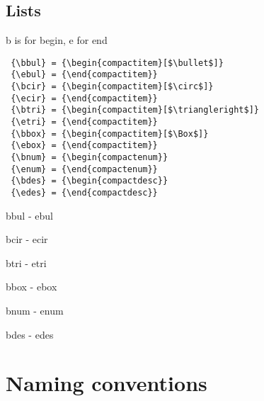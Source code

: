 \subsection{Lists}
b is for begin, e for end
\begin{verbatim}
 {\bbul} = {\begin{compactitem}[$\bullet$]}
 {\ebul} = {\end{compactitem}}
 {\bcir} = {\begin{compactitem}[$\circ$]}
 {\ecir} = {\end{compactitem}}
 {\btri} = {\begin{compactitem}[$\triangleright$]}
 {\etri} = {\end{compactitem}}
 {\bbox} = {\begin{compactitem}[$\Box$]}
 {\ebox} = {\end{compactitem}}
 {\bnum} = {\begin{compactenum}}
 {\enum} = {\end{compactenum}}
 {\bdes} = {\begin{compactdesc}}
 {\edes} = {\end{compactdesc}}
\end{verbatim}
\bbul
\item bbul - ebul
\ebul
\bcir
\item bcir - ecir
\ecir
\btri
\item btri - etri
\etri
\bbox
\item bbox - ebox
\ebox
\bnum
\item bnum - enum
\enum
\bdes
\item[item] bdes - edes
\edes
\section{Naming conventions}
